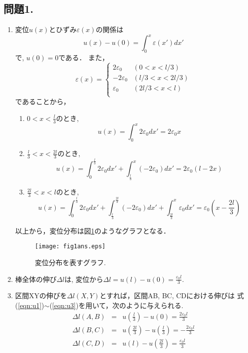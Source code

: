 \documentclass[10pt,a4j]{jarticle}
\begin{document}
\subsection*{問題1.}
\begin{enumerate}
\item
変位$u(x)$とひずみ$\varepsilon(x)$の関係は
\begin{equation}
	u(x)-u(0)=\int_0^x \varepsilon(x')dx'
	\label{eqn:eq1}
\end{equation}
で, $u(0)=0$である．
また，
\begin{equation}
	\varepsilon(x) = \left\{
	\begin{array}{cc}
		 2\varepsilon_0 & (0<x<l/3) \\
		-2\varepsilon_0 & (l/3<x<2l/3) \\
		  \varepsilon_0 & (2l/3<x<l) \\
	\end{array}
	\right.
\end{equation}
であることから，
\begin{enumerate}
\item 
$0<x<\frac{l}{3}$のとき, 
\begin{equation}
	u(x) = 
	\int_0^x 2\varepsilon_0 dx '=2\varepsilon_0 x
	\label{eqn:u1}
\end{equation}
\item
$\frac{l}{3}<x<\frac{2l}{3}$のとき, 
\begin{equation}
	u(x) =
		\int_0^{\frac{l}{3}} 2\varepsilon_0 dx '
		+
		\int_{\frac{l}{3}}^x (-2\varepsilon_0 )dx '
		=
		2\varepsilon_0 \left( l-2x \right)
	\label{eqn:u2}
\end{equation}
\item
$\frac{2l}{3}<x<l$のとき, 
\begin{equation}
	u(x) =
		\int_0^{\frac{l}{3}} 2\varepsilon_0 dx '
		+
		\int_{\frac{l}{3}}^{\frac{2l}{3}} (-2\varepsilon_0) dx '
		+
		\int_{\frac{2l}{3}}^x \varepsilon_0 dx '
	=
		\varepsilon_0  \left( x-\frac{2l}{3}\right)
	\label{eqn:u3}
\end{equation}
\end{enumerate}
以上から，変位分布は図\ref{fig:fig1}のようなグラフとなる．
%
\begin{figure}[h]
	\begin{center}
	\texttt{[image: fig1ans.eps]} 
	\end{center}
	\caption{変位分布を表すグラフ.} 
	\label{fig:fig1}
\end{figure}
\item
	棒全体の伸び$\Delta l$は, 変位から$\Delta l=u(l)-u(0)=\frac{\varepsilon_0l}{3}$.
\item
	区間XYの伸びを$\Delta l(X,Y)$とすれば，区間AB, BC, CDにおける伸びは
	式(\ref{eqn:u1})$\sim$(\ref{eqn:u3})を用いて，次のように与えられる.
	\begin{eqnarray*}
		\Delta l(A,B) 
		&=& 
		u\left( \frac{l}{3}\right)-u(0)=\frac{2\varepsilon_0l}{3}
		\\
		\Delta l(B,C)
		&=&
		u\left( \frac{2l}{3}\right)-u\left(\frac{l}{3}\right)
		=-\frac{2\varepsilon_0l}{3}
		\\	
		\Delta l(C,D)
		&=&u(l)-u\left( \frac{2l}{3}\right)=\frac{\varepsilon_0l}{3}
	\end{eqnarray*}	
\end{enumerate}
\end{document}
